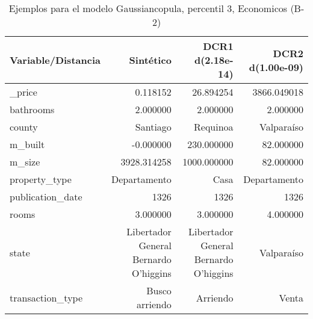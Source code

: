 \begin{table}[H]
\centering
\fontsize{10}{14}\selectfont
\caption{Ejemplos para el modelo Gaussiancopula, percentil 3, Economicos (B-2)}
\label{table-example-economicos-b-2-gaussiancopula-3p}
\begin{tabular}{|l|r|r|r|}
\hline
\rowcolor[gray]{0.8}
Variable/Distancia & Sintético & DCR1 d(2.18e-14) & DCR2 d(1.00e-09) \\
\hline \_price & \cellcolor[rgb]{0.9, 0.54, 0.52} 0.118152 & 26.894254 & 3866.049018 \\
\hline bathrooms & \cellcolor[rgb]{0.9, 0.54, 0.52} 2.000000 & \cellcolor[rgb]{0.9, 0.54, 0.52} 2.000000 & \cellcolor[rgb]{0.9, 0.54, 0.52} 2.000000 \\
\hline county & \cellcolor[rgb]{0.9, 0.54, 0.52} Santiago & Requinoa & Valparaíso \\
\hline m\_built & \cellcolor[rgb]{0.9, 0.54, 0.52} -0.000000 & 230.000000 & 82.000000 \\
\hline m\_size & \cellcolor[rgb]{0.9, 0.54, 0.52} 3928.314258 & 1000.000000 & 82.000000 \\
\hline property\_type & \cellcolor[rgb]{0.9, 0.54, 0.52} Departamento & Casa & \cellcolor[rgb]{0.9, 0.54, 0.52} Departamento \\
\hline publication\_date & \cellcolor[rgb]{0.9, 0.54, 0.52} 1326 & \cellcolor[rgb]{0.9, 0.54, 0.52} 1326 & \cellcolor[rgb]{0.9, 0.54, 0.52} 1326 \\
\hline rooms & \cellcolor[rgb]{0.9, 0.54, 0.52} 3.000000 & \cellcolor[rgb]{0.9, 0.54, 0.52} 3.000000 & 4.000000 \\
\hline state & \cellcolor[rgb]{0.9, 0.54, 0.52} Libertador General Bernardo O'higgins & \cellcolor[rgb]{0.9, 0.54, 0.52} Libertador General Bernardo O'higgins & Valparaíso \\
\hline transaction\_type & \cellcolor[rgb]{0.9, 0.54, 0.52} Busco arriendo & Arriendo & Venta \\
\hline
\end{tabular}
\end{table}
